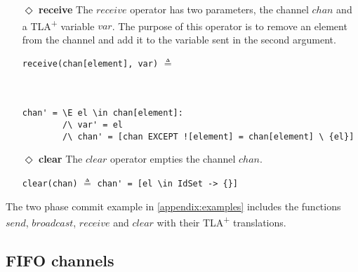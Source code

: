 \documentclass{thesul}
\newcommand{\tlaplus}{TLA\textsuperscript{+}\xspace}
\begin{document}
\begin{itemize}
\begin{minipage}{.44\textwidth}

\lstinline|multicast(chan, [a \in sub -> msg])| $\triangleq$\\\\\\
\end{minipage}\hfill
\begin{minipage}{.6\textwidth}
\begin{lstlisting}[frame = none, numbers = none]
chan'=[el \in DOMAIN chan 
			|-> IF el \in sub 
       THEN chan[el] \cup {msg} 
       ELSE chan[el]
\end{lstlisting}

\end{minipage}\hfill

\item[$\Diamond$]  \textbf{receive}
The $receive$ operator has two parameters, the channel $chan$ and a \tlaplus variable $var$. The purpose of this operator is to remove an element from the channel and add it to the variable sent in the second argument.

\begin{minipage}{.35\textwidth}

\lstinline|receive(chan[element], var)| $\triangleq$\\\\\\
\end{minipage}\hfill
\begin{minipage}{.6\textwidth}
\begin{lstlisting}[frame = none, numbers = none]
chan' = \E el \in chan[element]:
        /\ var' = el
        /\ chan' = [chan EXCEPT ![element] = chan[element] \ {el}]
\end{lstlisting}

\end{minipage}\hfill

\item[$\Diamond$]  \textbf{clear}
The $clear$ operator empties the channel $chan$.

\lstinline|clear(chan)| $\triangleq$
\lstinline|chan' = [el \in IdSet -> {}]|

\end{itemize}

The two phase commit example in \ref{appendix:examples} includes the functions $send$, $broadcast$, $receive$ and $clear$ with their \tlaplus translations.

\subsection{FIFO channels}
\end{document}
